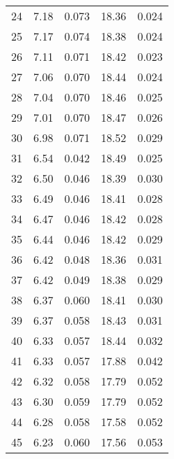 \begin{table}
\begin{tabular}{c|ll|ll}
24 & 7.18 & 0.073 & 18.36 & 0.024 \\
25 & 7.17 & 0.074 & 18.38 & 0.024 \\
26 & 7.11 & 0.071 & 18.42 & 0.023 \\
27 & 7.06 & 0.070 & 18.44 & 0.024 \\
28 & 7.04 & 0.070 & 18.46 & 0.025 \\
29 & 7.01 & 0.070 & 18.47 & 0.026 \\
30 & 6.98 & 0.071 & 18.52 & 0.029 \\
31 & 6.54 & 0.042 & 18.49 & 0.025 \\
32 & 6.50 & 0.046 & 18.39 & 0.030 \\
33 & 6.49 & 0.046 & 18.41 & 0.028 \\
34 & 6.47 & 0.046 & 18.42 & 0.028 \\
35 & 6.44 & 0.046 & 18.42 & 0.029 \\
36 & 6.42 & 0.048 & 18.36 & 0.031 \\
37 & 6.42 & 0.049 & 18.38 & 0.029 \\
38 & 6.37 & 0.060 & 18.41 & 0.030 \\
39 & 6.37 & 0.058 & 18.43 & 0.031 \\
40 & 6.33 & 0.057 & 18.44 & 0.032 \\
41 & 6.33 & 0.057 & 17.88 & 0.042 \\
42 & 6.32 & 0.058 & 17.79 & 0.052 \\
43 & 6.30 & 0.059 & 17.79 & 0.052 \\
44 & 6.28 & 0.058 & 17.58 & 0.052 \\
45 & 6.23 & 0.060 & 17.56 & 0.053 \\
               \hline
        \end{tabular}
    \end{table}
    \clearpage


